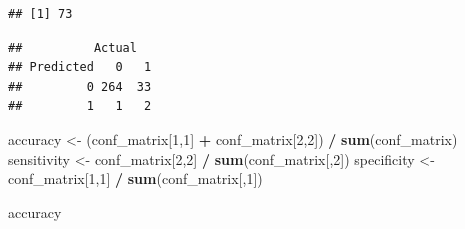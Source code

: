 \documentclass[
]{article}
\newenvironment{Shaded}{\begin{snugshade}}{\end{snugshade}}
\newcommand{\AttributeTok}[1]{\textcolor[rgb]{0.13,0.29,0.53}{#1}}
\newcommand{\DecValTok}[1]{\textcolor[rgb]{0.00,0.00,0.81}{#1}}
\newcommand{\FloatTok}[1]{\textcolor[rgb]{0.00,0.00,0.81}{#1}}
\newcommand{\FunctionTok}[1]{\textcolor[rgb]{0.13,0.29,0.53}{\textbf{#1}}}
\newcommand{\NormalTok}[1]{#1}
\newcommand{\OtherTok}[1]{\textcolor[rgb]{0.56,0.35,0.01}{#1}}
\newcommand{\SpecialCharTok}[1]{\textcolor[rgb]{0.81,0.36,0.00}{\textbf{#1}}}
\begin{document}
\begin{Shaded}
\end{Shaded}

\begin{verbatim}
## [1] 73
\end{verbatim}

\begin{Shaded}
\end{Shaded}

\begin{verbatim}
##          Actual
## Predicted   0   1
##         0 264  33
##         1   1   2
\end{verbatim}

\begin{Shaded}
\begin{Highlighting}[]
\NormalTok{accuracy }\OtherTok{\textless{}{-}}\NormalTok{ (conf\_matrix[}\DecValTok{1}\NormalTok{,}\DecValTok{1}\NormalTok{] }\SpecialCharTok{+}\NormalTok{ conf\_matrix[}\DecValTok{2}\NormalTok{,}\DecValTok{2}\NormalTok{]) }\SpecialCharTok{/} \FunctionTok{sum}\NormalTok{(conf\_matrix)}
\NormalTok{sensitivity }\OtherTok{\textless{}{-}}\NormalTok{ conf\_matrix[}\DecValTok{2}\NormalTok{,}\DecValTok{2}\NormalTok{] }\SpecialCharTok{/} \FunctionTok{sum}\NormalTok{(conf\_matrix[,}\DecValTok{2}\NormalTok{])}
\NormalTok{specificity }\OtherTok{\textless{}{-}}\NormalTok{ conf\_matrix[}\DecValTok{1}\NormalTok{,}\DecValTok{1}\NormalTok{] }\SpecialCharTok{/} \FunctionTok{sum}\NormalTok{(conf\_matrix[,}\DecValTok{1}\NormalTok{])}

\NormalTok{accuracy}
\end{Highlighting}
\end{Shaded}
\end{document}
